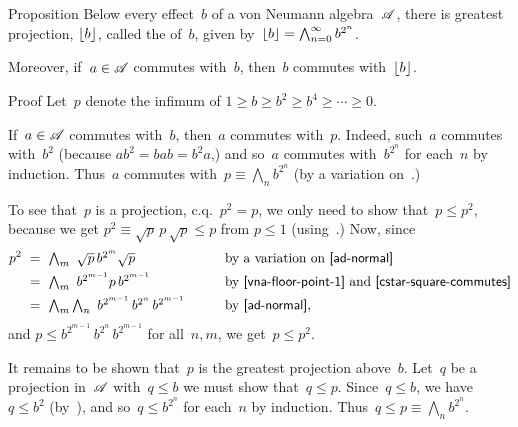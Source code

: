 \documentclass[main]{subfiles}
\begin{document}
%
%
\begin{parsec}%
\begin{point}{Proposition}%
Below every effect~$b$ of a von Neumann algebra~$\mathscr{A}$,
there is greatest projection, $\left\lfloor b\right\rfloor$,
called the  of~$b$,
given by~$\left\lfloor b\right\rfloor = \bigwedge_{n=0}^\infty b^{2^{n}}$.
\begin{point}%
Moreover, if~$a\in \mathscr{A}$ commutes with~$b$,
then~$b$ commutes with~$\left\lfloor b\right\rfloor$.
\end{point}
\end{point}
\begin{point}{Proof}%
Let~$p$ denote the infimum of $1\geq b\geq b^2 \geq b^4 \geq  \dotsb \geq 0$.
\begin{point}%
If~$a\in \mathscr{A}$ commutes with~$b$,
then~$a$ commutes with~$p$.
Indeed, such~$a$ commutes with~$b^2$ (because
$ab^2 = bab = b^2a$,)
and so~$a$ commutes with~$b^{2^n}$ for each~$n$ by induction.
Thus~$a$ commutes with~$p\equiv\bigwedge_n b^{2^n}$ 
(by a variation on~.)
\end{point}
\begin{point}%
To see that~$p$ is a projection, c.q.~$p^2=p$,
we only need to show that~$p\leq p^2$,
because we get $p^2\equiv \sqrt{p}\,p\,\sqrt{p}\leq p$
from $p\leq 1$ (using~.)
Now, since
\begin{alignat*}{3}
p^2 \ &=\ \textstyle \bigwedge_m\  \sqrt{p}\, b^{2^m} \sqrt{p}\qquad
&&\text{by a variation on~\sref{ad-normal}}\\
&=\ \textstyle \bigwedge_m \ b^{2^{m-1}} p\, b^{2^{m-1}}\qquad
&&\text{by~\sref{vna-floor-point-1} and~\sref{cstar-square-commutes}}\\
&=\ \textstyle \bigwedge_m \bigwedge_n \ 
b^{2^{m-1}}\, b^{2^n}\, b^{2^{m-1}}\qquad
&&\text{by~\sref{ad-normal},}
\end{alignat*}
and $p\leq b^{2^{m-1}}\, b^{2^n}\,b^{2^{m-1}}$
for all~$n,m$, we get~$p\leq p^2$.
\end{point}
\begin{point}%
It remains to be shown that~$p$ is the greatest projection above~$b$.
Let~$q$ be a projection in~$\mathscr{A}$ with~$q\leq b$
we must show that~$q\leq p$.
Since~$q\leq b$,
we have~$q\leq b^2$ (by~),
and so~$q\leq b^{2^n}$ for each~$n$ by induction.
Thus~$q\leq p\equiv\bigwedge_n b^{2^n}$.
\end{point}
\end{point}
\end{parsec}
\end{document}
